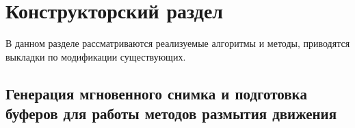 \chapter{Конструкторский раздел}
\label{cha:design}

В данном разделе рассматриваются реализуемые алгоритмы и методы, приводятся выкладки по модификации существующих.

\section{Генерация мгновенного снимка и подготовка буферов для работы методов размытия движения}





    

